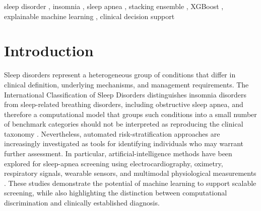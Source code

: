 \documentclass[a4paper,fleqn]{cas-dc}
\begin{document}
\begin{keywords}
sleep disorder \sep
insomnia \sep
sleep apnea \sep
stacking ensemble \sep
XGBoost \sep
explainable machine learning \sep
clinical decision support
\end{keywords}

\maketitle

\section{Introduction}

Sleep disorders represent a heterogeneous group of conditions that differ in clinical definition, underlying mechanisms, and management requirements. The International Classification of Sleep Disorders distinguishes insomnia disorders from sleep-related breathing disorders, including obstructive sleep apnea, and therefore a computational model that groups such conditions into a small number of benchmark categories should not be interpreted as reproducing the clinical taxonomy \cite{aasm2023}. Nevertheless, automated risk-stratification approaches are increasingly investigated as tools for identifying individuals who may warrant further assessment. In particular, artificial-intelligence methods have been explored for sleep-apnea screening using electrocardiography, oximetry, respiratory signals, wearable sensors, and multimodal physiological measurements \cite{bazoukis2023,tyagi2023,abdalrazaq2024,giorgi2025}. These studies demonstrate the potential of machine learning to support scalable screening, while also highlighting the distinction between computational discrimination and clinically established diagnosis.
\end{document}
